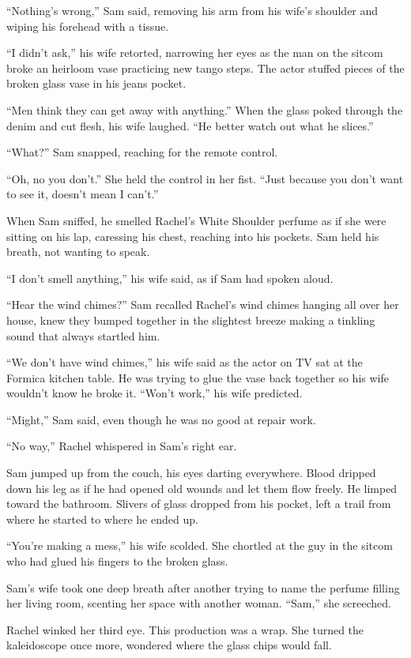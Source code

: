 \documentclass[twoside,10pt]{book}
\begin{document}
``Nothing's wrong,'' Sam said, removing his arm from his wife's shoulder
and wiping his fore­head with a tissue.

``I didn't ask,'' his wife retorted, narrowing her eyes as the man on
the sitcom broke an heir­loom vase practicing new tango steps. The actor
stuffed pieces of the broken glass vase in his jeans pocket.

``Men think they can get away with anything.'' When the glass poked
through the denim and cut flesh, his wife laughed. ``He better watch out
what he slices.''

``What?'' Sam snapped, reaching for the remote control.

``Oh, no you don't.'' She held the control in her fist. ``Just because
you don't want to see it, doesn't mean I can't.''

When Sam sniffed, he smelled Rachel's White Shoulder perfume as if she
were sitting on his lap, caressing his chest, reaching into his pockets.
Sam held his breath, not wanting to speak.

``I don't smell anything,'' his wife said, as if Sam had spoken aloud.

``Hear the wind chimes?'' Sam recalled Rachel's wind chimes hanging all
over her house, knew they bumped together in the slightest breeze making
a tinkling sound that always startled him.

``We don't have wind chimes,'' his wife said as the actor on TV sat at
the Formica kitchen table. He was trying to glue the vase back together
so his wife wouldn't know he broke it. ``Won't work,'' his wife
predicted.

``Might,'' Sam said, even though he was no good at repair work.

``No way,'' Rachel whispered in Sam's right ear.

Sam jumped up from the couch, his eyes darting everywhere. Blood dripped
down his leg as if he had opened old wounds and let them flow freely. He
limped toward the bathroom. Slivers of glass dropped from his pocket,
left a trail from where he started to where he ended up.

``You're making a mess,'' his wife scolded. She chortled at the guy in
the sitcom who had glued his fingers to the broken glass.

Sam's wife took one deep breath after another trying to name the perfume
filling her living room, scenting her space with another woman. ``Sam,''
she screeched.

Rachel winked her third eye. This production was a wrap. She turned the
kaleidoscope once more, wondered where the glass chips would fall.
\end{document}

